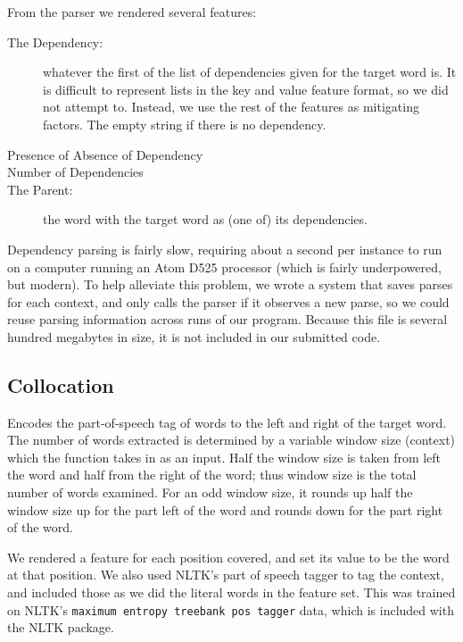 \documentclass{article}
\begin{document}
From the parser we rendered several features:

\begin{description}

\item[The Dependency:] whatever the first of the list of dependencies given for
the target word is.  It is difficult to represent lists in the key and value
feature format, so we did not attempt to.  Instead, we use the rest of the
features as mitigating factors.  The empty string if there is no dependency.

\item[Presence of Absence of Dependency]

\item[Number of Dependencies]

\item[The Parent:] the word with the target word as (one of) its dependencies.

\end{description}

Dependency parsing is fairly slow, requiring about a second per instance to run
on a computer running an Atom D525 processor (which is fairly underpowered, but
modern).  To help alleviate this problem, we wrote a system that saves parses
for each context, and only calls the parser if it observes a new parse, so we
could reuse parsing information across runs of our program.  Because this file
is several hundred megabytes in size, it is not included in our
submitted code.

\subsection{Collocation}

Encodes the part-of-speech tag of words to the left and right of the target
word. The number of words extracted is determined by a variable window size
(context) which the function takes in as an input. Half the window size is
taken from left the word and half from the right of the word; thus window size
is the total number of words examined. For an odd window size, it rounds up
half the window size up for the part left of the word and rounds down for the
part right of the word.

We rendered a feature for each position covered, and set its value to be the
word at that position. We also used NLTK's part of speech tagger to
tag the context, and included those as we did the literal words in the
feature set.  This was trained on NLTK's
\verb+maximum entropy treebank pos tagger+ data, which is included
with the NLTK package.
\end{document}
